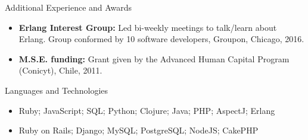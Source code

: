 \documentclass[]{mcdowellcv}
\begin{document}
	\begin{cvsection}{Additional Experience and Awards}
		\begin{cvsubsection}{}{}{}	
			\begin{itemize}
			        \item \textbf{Erlang Interest Group:} Led bi-weekly meetings to talk/learn about Erlang. Group conformed by 10 software developers, Groupon, Chicago, 2016.
				\item \textbf{M.S.E. funding:} Grant given by the Advanced Human Capital Program (Conicyt), Chile, 2011.
			\end{itemize}
		\end{cvsubsection}
	\end{cvsection}
	
	\begin{cvsection}{Languages and Technologies}
		\begin{cvsubsection}{}{}{}	
			\begin{itemize}
				\item Ruby; JavaScript; SQL; Python; Clojure; Java; PHP; AspectJ; Erlang 
				\item Ruby on Rails; Django; MySQL; PostgreSQL; NodeJS; CakePHP
			\end{itemize}
		\end{cvsubsection}
	\end{cvsection}
\end{document}
